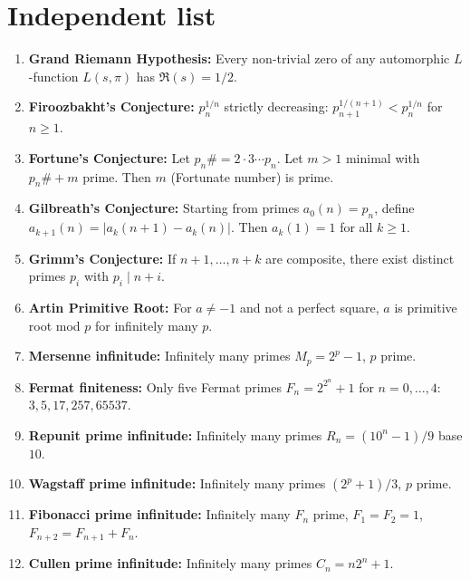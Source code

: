 \documentclass[aps,prd,amsmath,amssymb,twocolumn,superscriptaddress]{revtex4-2}
\begin{document}
\section{Independent list}

\begin{enumerate}[label={\bf \arabic*.}, leftmargin=*, itemsep=2pt]

\item \textbf{Grand Riemann Hypothesis:} Every non-trivial zero of any automorphic $L$-function $L(s,\pi)$ has $\Re(s)=1/2$.

\item \textbf{Firoozbakht's Conjecture:} $p_n^{1/n}$ strictly decreasing: $p_{n+1}^{1/(n+1)}<p_n^{1/n}$ for $n\ge1$.

\item \textbf{Fortune's Conjecture:} Let $p_n\#=2\cdot3\cdots p_n$. Let $m>1$ minimal with $p_n\#+m$ prime. Then $m$ (Fortunate number) is prime.

\item \textbf{Gilbreath's Conjecture:} Starting from primes $a_0(n)=p_n$, define $a_{k+1}(n)=|a_k(n+1)-a_k(n)|$. Then $a_k(1)=1$ for all $k\ge1$.

\item \textbf{Grimm's Conjecture:} If $n+1,\dots,n+k$ are composite, there exist distinct primes $p_i$ with $p_i\mid n+i$.

\item \textbf{Artin Primitive Root:} For $a\neq-1$ and not a perfect square, $a$ is primitive root mod $p$ for infinitely many $p$.

\item \textbf{Mersenne infinitude:} Infinitely many primes $M_p=2^p-1$, $p$ prime.

\item \textbf{Fermat finiteness:} Only five Fermat primes $F_n=2^{2^n}+1$ for $n=0,\dots,4$: $3,5,17,257,65537$.

\item \textbf{Repunit prime infinitude:} Infinitely many primes $R_n=(10^n-1)/9$ base $10$.

\item \textbf{Wagstaff prime infinitude:} Infinitely many primes $(2^p+1)/3$, $p$ prime.

\item \textbf{Fibonacci prime infinitude:} Infinitely many $F_n$ prime, $F_1=F_2=1$, $F_{n+2}=F_{n+1}+F_n$.

\item \textbf{Cullen prime infinitude:} Infinitely many primes $C_n=n2^n+1$.


\end{enumerate}
\end{document}
